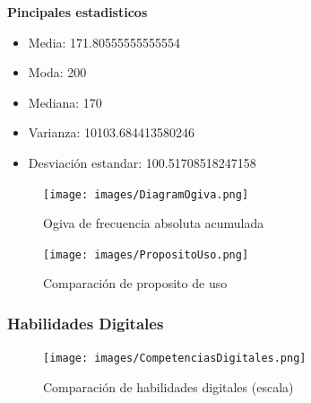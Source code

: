 \documentclass[12pt, a4paper]{article}
\begin{document}
\textbf{Pincipales estadisticos}

\begin{itemize}
    \item Media: 171.80555555555554
    \item Moda: 200
    \item Mediana: 170
    \item Varianza: 10103.684413580246
    \item Desviación estandar: 100.51708518247158
\end{itemize}

\begin{figure}[H]
    \begin{center}
        \texttt{[image: images/DiagramOgiva.png]}
    \end{center}
    \label{fig:DiagramOgiva}
    \caption{Ogiva de frecuencia absoluta acumulada}
\end{figure}

\begin{figure}[H]
    \begin{center}
        \texttt{[image: images/PropositoUso.png]}
    \end{center}
    \label{fig:PropositoUso}
    \caption{Comparación de proposito de uso}
\end{figure}

\subsubsection{Habilidades Digitales}

\begin{figure}[H]
    \begin{center}
        \texttt{[image: images/CompetenciasDigitales.png]}
    \end{center}
    \label{fig:CompetenciasDigitales}
    \caption{Comparación de habilidades digitales (escala)}
\end{figure}

\newpage
\end{document}
